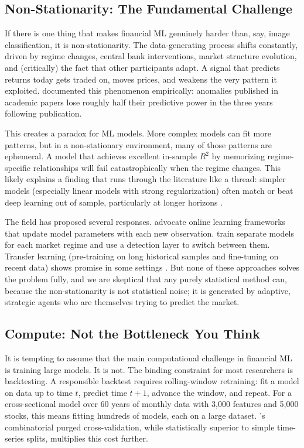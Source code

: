\subsection{Non-Stationarity: The Fundamental Challenge}

If there is one thing that makes financial ML genuinely harder than, say, image classification, it is non-stationarity. The data-generating process shifts constantly, driven by regime changes, central bank interventions, market structure evolution, and (critically) the fact that other participants adapt. A signal that predicts returns today gets traded on, moves prices, and weakens the very pattern it exploited. \citet{McLean2016} documented this phenomenon empirically: anomalies published in academic papers lose roughly half their predictive power in the three years following publication.

This creates a paradox for ML models. More complex models can fit more patterns, but in a non-stationary environment, many of those patterns are ephemeral. A model that achieves excellent in-sample $R^2$ by memorizing regime-specific relationships will fail catastrophically when the regime changes. This likely explains a finding that runs through the literature like a thread: simpler models (especially linear models with strong regularization) often match or beat deep learning out of sample, particularly at longer horizons \citep{Avramov2023}.

The field has proposed several responses. \citet{Huck2019} advocate online learning frameworks that update model parameters with each new observation. \citet{Nystrup2020} train separate models for each market regime and use a detection layer to switch between them. Transfer learning (pre-training on long historical samples and fine-tuning on recent data) shows promise in some settings \citep{Li2022}. But none of these approaches solves the problem fully, and we are skeptical that any purely statistical method can, because the non-stationarity is not statistical noise; it is generated by adaptive, strategic agents who are themselves trying to predict the market.

\subsection{Compute: Not the Bottleneck You Think}

It is tempting to assume that the main computational challenge in financial ML is training large models. It is not. The binding constraint for most researchers is backtesting. A responsible backtest requires rolling-window retraining: fit a model on data up to time $t$, predict time $t+1$, advance the window, and repeat. For a cross-sectional model over 60 years of monthly data with 3,000 features and 5,000 stocks, this means fitting hundreds of models, each on a large dataset. \citet{DePrado2018}'s combinatorial purged cross-validation, while statistically superior to simple time-series splits, multiplies this cost further.

